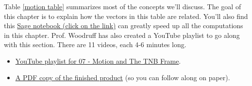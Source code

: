 \vskip0.2cm
Table \ref{motion table} summarizes most of the concepts we'll discuss. The goal of this chapter is to explain how the vectors in this table are related.  You'll also find this \href{\sageurlforcurvature}{Sage notebook (click on the link)} can greatly speed up all the computations in this chapter. Prof. Woodruff has also created a YouTube playlist to go along with this section. There are 11 videos, each 4-6 minutes long.
\begin{itemize}
 \item \href{http://www.youtube.com/playlist?list=PL30EE81142B1ED1F0&feature=plcp}{YouTube playlist for 07 - Motion and The TNB Frame}.
 \item \href{http://db.tt/FmEGk9p5}{A PDF copy of the finished product} (so you can follow along on paper).
\end{itemize}

\clearpage

